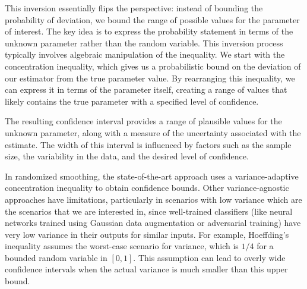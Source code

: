 This inversion essentially flips the perspective: instead of bounding the probability of deviation, we bound the range of possible values for the parameter of interest.
The key idea is to express the probability statement in terms of the unknown parameter rather than the random variable.
This inversion process typically involves algebraic manipulation of the inequality.
We start with the concentration inequality, which gives us a probabilistic bound on the deviation of our estimator from the true parameter value.
By rearranging this inequality, we can express it in terms of the parameter itself, creating a range of values that likely contains the true parameter with a specified level of confidence.

The resulting confidence interval provides a range of plausible values for the unknown parameter, along with a measure of the uncertainty associated with the estimate.
The width of this interval is influenced by factors such as the sample size, the variability in the data, and the desired level of confidence.

In randomized smoothing, the state-of-the-art approach uses a variance-adaptive concentration inequality to obtain confidence bounds.
Other variance-agnostic approaches have limitations, particularly in scenarios with low variance which are the scenarios that we are interested in, since well-trained classifiers (like neural networks trained using Gaussian data augmentation or adversarial training) have very low variance in their outputs for similar inputs.
For example, Hoeffding's inequality assumes the worst-case scenario for variance, which is $1/4$ for a bounded random variable in $[0,1]$.
This assumption can lead to overly wide confidence intervals when the actual variance is much smaller than this upper bound.

